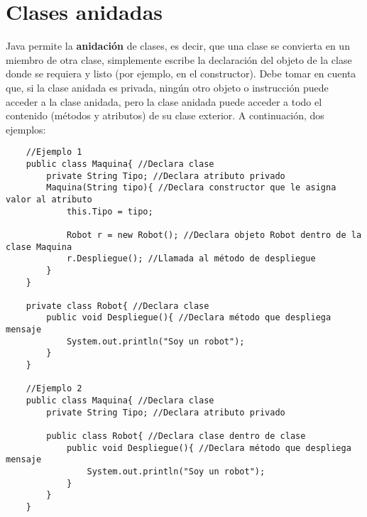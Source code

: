 \section{Clases anidadas}
Java permite la \textbf{anidación} de clases, es decir, que una clase se convierta en un miembro de otra clase, simplemente escribe la declaración del objeto de la clase donde se requiera y listo (por ejemplo, en el constructor). Debe tomar en cuenta que, si la clase anidada es privada, ningún otro objeto o instrucción puede acceder a la clase anidada, pero la clase anidada puede acceder a todo el contenido (métodos y atributos) de su clase exterior. A continuación, dos ejemplos:
\begin{lstlisting}
    //Ejemplo 1
    public class Maquina{ //Declara clase
        private String Tipo; //Declara atributo privado
        Maquina(String tipo){ //Declara constructor que le asigna valor al atributo
            this.Tipo = tipo;
            
            Robot r = new Robot(); //Declara objeto Robot dentro de la clase Maquina
            r.Despliegue(); //Llamada al método de despliegue
        }
    }
    
    private class Robot{ //Declara clase
        public void Despliegue(){ //Declara método que despliega mensaje
            System.out.println("Soy un robot");
        }
    }
    
    //Ejemplo 2
    public class Maquina{ //Declara clase
        private String Tipo; //Declara atributo privado
        
        public class Robot{ //Declara clase dentro de clase
            public void Despliegue(){ //Declara método que despliega mensaje
                System.out.println("Soy un robot");
            }
        }
    }
\end{lstlisting}